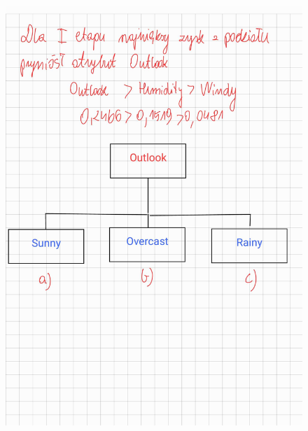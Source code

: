 \documentclass{article}
\begin{document}
\begin{figure}[H]
    \centering
    \includegraphics[width=\textwidth]{tree3.jpg}
\end{figure}
\end{document}
